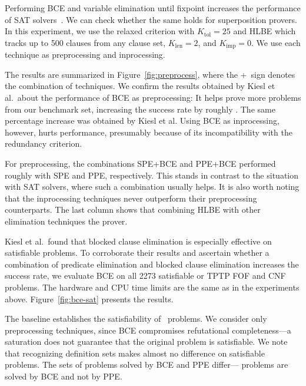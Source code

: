 Performing BCE and variable elimination until fixpoint increases the performance
of SAT solvers~\cite{jbh-10-BCE}. We can check whether the same holds for superposition provers.
In this experiment, we use the relaxed criterion with
$K_\mathrm{tol}=25$ and HLBE which tracks up
to 500 clauses from any clause set, $K_\mathrm{len}=2$, and
$K_{\mathrm{imp}}=0$. We use each technique as preprocessing and inprocessing.

The results are summarized in Figure~\ref{fig:preprocess}, where
the +~sign denotes the combination of techniques.
We confirm the results obtained by Kiesl et al.\ about the performance of BCE
as preprocessing:
It helps prove  more problems from our benchmark set, increasing the
success rate by roughly . The same percentage increase was obtained by Kiesl et al.
%
Using BCE as inprocessing, however, hurts performance, presumably because of
its incompatibility with the redundancy criterion.

%
For preprocessing, the combinations SPE+BCE and PPE+BCE performed roughly  with SPE and PPE, respectively. This stands in contrast to the situation
with SAT solvers, where such a combination usually helps. It is also worth noting
that the inprocessing techniques never outperform their preprocessing
counterparts.
%
The last column shows that combining HLBE with other elimination techniques
 the prover.


%
%
Kiesl et al.\ found that blocked clause elimination is especially effective on
satisfiable problems. To corroborate their results and ascertain
whether a combination of predicate elimination and blocked clause elimination
increases the success rate, we evaluate BCE on all 2273
satisfiable or TPTP FOF and CNF problems.
The hardware and CPU time limits are the same as in the experiments above.
Figure~\ref{fig:bce-sat} presents the results.

The baseline establishes the satisfiability of \baseres~problems. We consider
only preprocessing techniques, since BCE compromises refutational
completeness---a saturation does not guarantee that the original problem is
satisfiable. We note that recognizing definition sets makes almost no difference on
satisfiable problems. The sets of problems solved by BCE and PPE
differ--- problems are solved by BCE and not by PPE.

